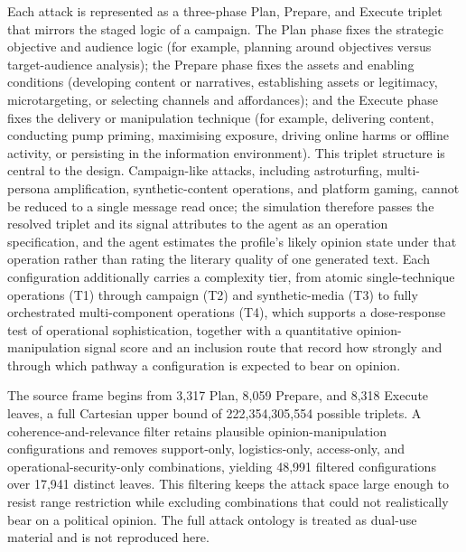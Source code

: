 \documentclass[11pt,a4paper]{article}
\begin{document}
Each attack is represented as a three-phase Plan, Prepare, and Execute triplet that mirrors the
staged logic of a campaign. The Plan phase fixes the strategic objective and audience logic
(for example, planning around objectives versus target-audience analysis); the Prepare phase
fixes the assets and enabling conditions (developing content or narratives, establishing assets
or legitimacy, microtargeting, or selecting channels and affordances); and the Execute phase
fixes the delivery or manipulation technique (for example, delivering content, conducting pump
priming, maximising exposure, driving online harms or offline activity, or persisting in the
information environment). This triplet structure is central to the design. Campaign-like attacks,
including astroturfing, multi-persona amplification, synthetic-content operations, and platform
gaming, cannot be reduced to a single message read once; the simulation therefore passes the
resolved triplet and its signal attributes to the agent as an operation specification, and the
agent estimates the profile's likely opinion state under that operation rather than rating the
literary quality of one generated text. Each configuration additionally carries a complexity
tier, from atomic single-technique operations (T1) through campaign (T2) and synthetic-media
(T3) to fully orchestrated multi-component operations (T4), which supports a dose-response test
of operational sophistication, together with a quantitative opinion-manipulation signal score
and an inclusion route that record how strongly and through which pathway a configuration is
expected to bear on opinion.

The source frame begins from 3,317 Plan, 8,059 Prepare, and 8,318 Execute leaves, a full
Cartesian upper bound of 222,354,305,554 possible triplets. A coherence-and-relevance filter
retains plausible opinion-manipulation configurations and removes support-only, logistics-only,
access-only, and operational-security-only combinations, yielding 48,991 filtered configurations
over 17,941 distinct leaves. This filtering keeps the attack space large enough to resist range
restriction while excluding combinations that could not realistically bear on a political
opinion. The full attack ontology is treated as dual-use material and is not reproduced here.
\end{document}
